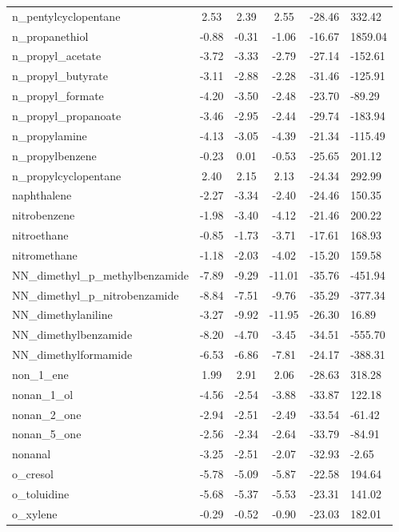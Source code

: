 \documentclass{amsart}
\begin{document}
\begin{longtable}{L|C|C|C|X|X}
n\_pentylcyclopentane & 2.53 & 2.39 & 2.55 & -28.46 & 332.42 \\ 
n\_propanethiol & -0.88 & -0.31 & -1.06 & -16.67 & 1859.04 \\ 
n\_propyl\_acetate & -3.72 & -3.33 & -2.79 & -27.14 & -152.61 \\ 
n\_propyl\_butyrate & -3.11 & -2.88 & -2.28 & -31.46 & -125.91 \\ 
n\_propyl\_formate & -4.20 & -3.50 & -2.48 & -23.70 & -89.29 \\ 
n\_propyl\_propanoate & -3.46 & -2.95 & -2.44 & -29.74 & -183.94 \\ 
n\_propylamine & -4.13 & -3.05 & -4.39 & -21.34 & -115.49 \\ 
n\_propylbenzene & -0.23 & 0.01 & -0.53 & -25.65 & 201.12 \\ 
n\_propylcyclopentane & 2.40 & 2.15 & 2.13 & -24.34 & 292.99 \\ 
naphthalene & -2.27 & -3.34 & -2.40 & -24.46 & 150.35 \\ 
nitrobenzene & -1.98 & -3.40 & -4.12 & -21.46 & 200.22 \\ 
nitroethane & -0.85 & -1.73 & -3.71 & -17.61 & 168.93 \\ 
nitromethane & -1.18 & -2.03 & -4.02 & -15.20 & 159.58 \\ 
NN\_dimethyl\_p\_methylbenzamide & -7.89 & -9.29 & -11.01 & -35.76 & -451.94 \\ 
NN\_dimethyl\_p\_nitrobenzamide & -8.84 & -7.51 & -9.76 & -35.29 & -377.34 \\ 
NN\_dimethylaniline & -3.27 & -9.92 & -11.95 & -26.30 & 16.89 \\ 
NN\_dimethylbenzamide & -8.20 & -4.70 & -3.45 & -34.51 & -555.70 \\ 
NN\_dimethylformamide & -6.53 & -6.86 & -7.81 & -24.17 & -388.31 \\ 
non\_1\_ene & 1.99 & 2.91 & 2.06 & -28.63 & 318.28 \\ 
nonan\_1\_ol & -4.56 & -2.54 & -3.88 & -33.87 & 122.18 \\ 
nonan\_2\_one & -2.94 & -2.51 & -2.49 & -33.54 & -61.42 \\ 
nonan\_5\_one & -2.56 & -2.34 & -2.64 & -33.79 & -84.91 \\ 
nonanal & -3.25 & -2.51 & -2.07 & -32.93 & -2.65 \\ 
o\_cresol & -5.78 & -5.09 & -5.87 & -22.58 & 194.64 \\ 
o\_toluidine & -5.68 & -5.37 & -5.53 & -23.31 & 141.02 \\ 
o\_xylene & -0.29 & -0.52 & -0.90 & -23.03 & 182.01 \\ 

\end{longtable}
\end{document}
